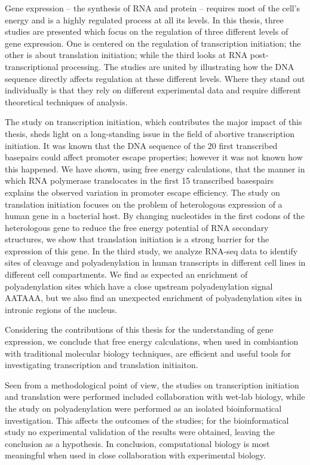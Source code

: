 Gene expression -- the synthesis of RNA and protein -- requires most of the
cell's energy and is a highly regulated process at all its levels.  In this
thesis, three studies are presented which focus on the regulation of three
different levels of gene expression. One is centered on the regulation of
transcription initiation; the other is about translation initiation; while the
third looks at RNA post-transcriptional processing. The studies are united by
illustrating how the DNA sequence directly affects regulation at these
different levels. Where they stand out individually is that they rely on
different experimental data and require different theoretical techniques of
analysis.

The study on transcription initiation, which contributes the major impact of
this thesis, sheds light on a long-standing issue in the field of abortive
transcription initiation. It was known that the DNA sequence of the 20 first
transcribed basepairs could affect promoter escape properties; however it was
not known how this happened. We have shown, using free energy calculations,
that the manner in which RNA polymerase translocates in the first 15
transcribed basespairs explains the observed variation in promoter escape
efficiency. The study on translation initiation focuses on the problem of
heterologous expression of a human gene in a bacterial host. By changing
nucleotides in the first codons of the heterologous gene to reduce the free
energy potential of RNA secondary structures, we show that translation
initiation is a strong barrier for the expression of this gene. In the third
study, we analyze RNA-seq data to identify sites of cleavage and
polyadenylation in human transcripts in different cell lines in different cell
compartments. We find as expected an enrichment of polyadenylation sites which
have a close upstream polyadenylation signal AATAAA, but we also find an
unexpected enrichment of polyadenylation sites in intronic regions of the
nucleus.

Considering the contributions of this thesis for the understanding of gene
expression, we conclude that free energy calculations, when used in combiantion
with traditional molecular biology techniques, are efficient and useful tools
for investigating transcription and translation initiaiton.

Seen from a methodological point of view, the studies on transcription
initiation and translation were performed included collaboration with wet-lab
biology, while the study on polyadenylation were performed as an isolated
bioinformatical investigation. This affects the outcomes of the studies; for
the bioinformatical study no experimental validation of the results were
obtained, leaving the conclusion as a hypothesis. In conclusion, computational
biology is most meaningful when used in close collaboration with experimental
biology. 
